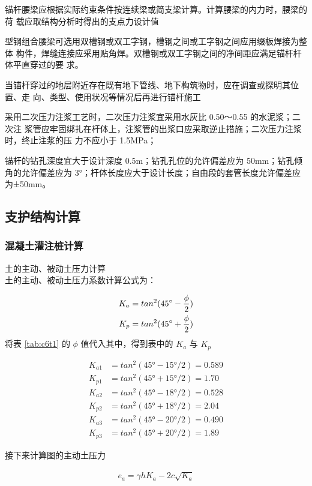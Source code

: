  锚杆腰梁应根据实际约束条件按连续梁或简支梁计算。计算腰梁的内力时，腰梁的荷
载应取结构分析时得出的支点力设计值

 型钢组合腰梁可选用双槽钢或双工字钢，槽钢之间或工字钢之间应用缀板焊接为整体
构件，焊缝连接应采用贴角焊。双槽钢或双工字钢之间的净间距应满足锚杆杆体平直穿过的要
求。

 当锚杆穿过的地层附近存在既有地下管线、地下构筑物时，应在调查或探明其位置、走
向、类型、使用状况等情况后再进行锚杆施工

 采用二次压力注浆工艺时，二次压力注浆宜采用水灰比 0.50～0.55 的水泥浆；二次注
浆管应牢固绑扎在杆体上，注浆管的出浆口应采取逆止措施；二次压力注浆时，终止注浆的压
力不应小于 1.5MPa；

 锚杆的钻孔深度宜大于设计深度 0.5m；钻孔孔位的允许偏差应为 50mm；钻孔倾角的允许偏差应为 3°；杆体长度应大于设计长度；自由段的套管长度允许偏差应为±50mm。 

\subsection{支护结构计算}
\subsubsection{混凝土灌注桩计算}

土的主动、被动土压力计算\\

土的主动、被动土压力系数计算公式为：

\begin{align}
    \label{fx:6.0}
    K_a&=tan^2(45^{\circ} -\frac{\phi }{2})\\
    \label{fx:6.0A}
    K_p&=tan^2(45^{\circ} +\frac{\phi }{2})
\end{align}
将表 \ref{tab:c6t1} 的 $\phi$ 值代入其中，得到表中的 $K_a$ 与 $K_p$

\begin{align*}
K_{a1}&=tan^2(45°-15°/2 )=0.589\\
K_{p1}&=tan^2(45°+15°/2 )=1.70 \\
K_{a2}&=tan^2(45°-18°/2 )=0.528 \\
K_{p2}&=tan^2(45°+18°/2 )=2.04\\
K_{a3}&=tan^2(45°-20°/2 )=0.490 \\
K_{p3}&=tan^2(45°+20°/2 )=1.89
\end{align*}

接下来计算图的主动土压力

\begin{align}
    \label{fx:6.1}
    e_a=\gamma hK_a-2c\sqrt{K_a}
\end{align}

